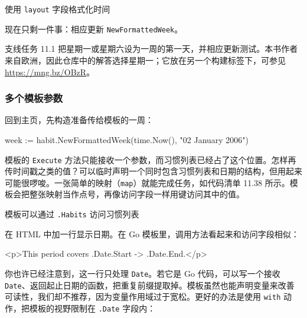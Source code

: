 \begin{codeannotations}
\item 使用 \texttt{layout} 字段格式化时间
\end{codeannotations}

现在只剩一件事：相应更新 \texttt{NewFormattedWeek}。

\begin{tipbox}{支线任务 11.1}
把星期一或星期六设为一周的第一天，并相应更新测试。本书作者来自欧洲，因此仓库中的解答选择星期一；它放在另一个构建标签下，可参见 \url{https://mng.bz/OBzR}。
\end{tipbox}

\subsubsection{多个模板参数}

回到主页，先构造准备传给模板的一周：

\begin{gocode}[]
week := habit.NewFormattedWeek(time.Now(), "02 January 2006")
\end{gocode}

模板的 \texttt{Execute} 方法只能接收一个参数，而习惯列表已经占了这个位置。怎样再传时间戳之类的值？可以临时声明一个同时包含习惯列表和日期的结构，但用起来可能很啰唆。一张简单的映射（\texttt{map}）就能完成任务，如代码清单 11.38 所示。模板会把整张映射当作点号，再像访问字段一样用键访问其中的值。


\begin{codeannotations}
\item 模板可以通过 \texttt{.Habits} 访问习惯列表
\end{codeannotations}

在 HTML 中加一行显示日期。在 Go 模板里，调用方法看起来和访问字段相似：

\begin{htmlcode}[]
<p>This period covers {{.Date.Start}} -> {{.Date.End}}.</p>
\end{htmlcode}

你也许已经注意到，这一行只处理 \texttt{Date}。若它是 Go 代码，可以写一个接收 \texttt{Date}、返回起止日期的函数，把重复前缀提取掉。模板虽然也能声明变量来改善可读性，我们却不推荐，因为变量作用域过于宽松。更好的办法是使用 \texttt{with} 动作，把模板的视野限制在 \texttt{.Date} 字段内：

